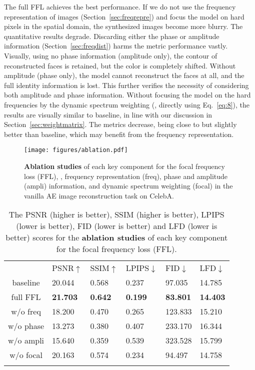 \documentclass[10pt,twocolumn,letterpaper]{article}
\begin{document}
The full FFL achieves the best performance.
If we do not use the frequency representation of images (Section~\ref{sec:freqrepre}) and focus the model on hard pixels in the spatial domain, the synthesized images become more blurry. The quantitative results degrade.
Discarding either the phase or amplitude information (Section~\ref{sec:freqdist}) harms the metric performance vastly. Visually, using no phase information (amplitude only), the contour of reconstructed faces is retained, but the color is completely shifted. Without amplitude (phase only), the model cannot reconstruct the faces at all, and the full identity information is lost. This further verifies the necessity of considering both amplitude and phase information.
Without focusing the model on the hard frequencies by the dynamic spectrum weighting (\ie, directly using Eq.~\eqref{eq:8}), the results are visually similar to baseline, in line with our discussion in Section~\ref{sec:weightmatrix}. The metrics decrease, being close to but slightly better than baseline, which may benefit from the frequency representation.


\begin{figure}[t]
	\centering
\texttt{[image: figures/ablation.pdf]}
	\vspace{-0.5cm}
	\caption{\textbf{Ablation studies} of each key component for the focal frequency loss (FFL), \ie, frequency representation (freq), phase and amplitude (ampli) information, and dynamic spectrum weighting (focal) in the vanilla AE image reconstruction task on CelebA.}
	\label{fig:ablation}
	\vspace{-0.1cm}
\end{figure}


\begin{table}[tb!]
\centering
\footnotesize
\caption{The PSNR (higher is better), SSIM (higher is better), LPIPS (lower is better), FID (lower is better) and LFD (lower is better) scores for the \textbf{ablation studies} of each key component for the focal frequency loss (FFL).}
\begin{tabularx}{\linewidth}{c|*{5}{|Y}}
\Xhline{1pt}
 & PSNR$\uparrow$& SSIM$\uparrow$& LPIPS$\downarrow$& FID$\downarrow$& LFD$\downarrow$ \\
\Xhline{0.6pt}
baseline & 20.044& 0.568& 0.237& 97.035& 14.785 \\
full FFL & {\bf21.703}& {\bf0.642}& {\bf0.199}& {\bf83.801}& {\bf14.403} \\
\Xhline{0.4pt}
w/o freq & 18.200& 0.470& 0.265& 123.833& 15.210 \\
w/o phase & 13.273& 0.380& 0.407& 233.170& 16.344 \\
w/o ampli & 15.640& 0.359& 0.539& 323.528& 15.799 \\
w/o focal & 20.163& 0.574& 0.234& 94.497& 14.758 \\
\Xhline{1pt}
\end{tabularx}
\label{tbl:ablation}
\vspace{-0.55cm}
\end{table}
\end{document}
